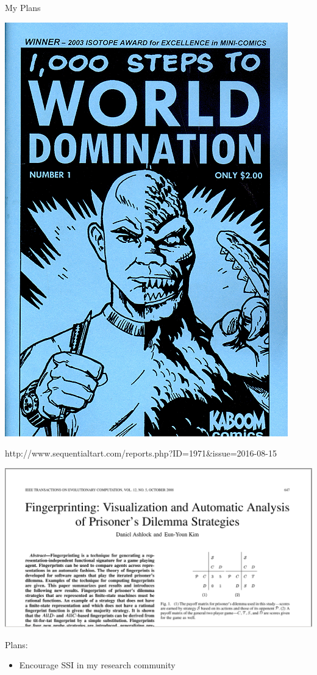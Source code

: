 \documentclass{beamer}
\begin{document}
\begin{frame}{My Plans}
	\begin{center}
		\includegraphics[width=.40\textwidth]{static/evil-mastermind.png}
	\end{center}

\hfill \tiny http://www.sequentialtart.com/reports.php?ID=1971\&issue=2016-08-15

\end{frame}

\begin{frame}
	\begin{center}
		\includegraphics[width=.80\textwidth]{static/ashlock.png}
	\end{center}
\end{frame}

\begin{frame}
    \begin{block}{Plans:}
    {
        \begin{itemize}
        \item Encourage SSI in my research community
        \end{itemize}
    }
    \end{block}
\end{frame}
\end{document}
